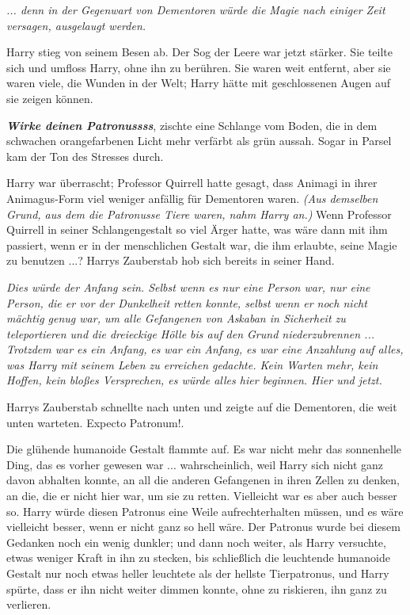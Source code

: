 \emph{... denn in der Gegenwart von Dementoren würde die Magie nach einiger
Zeit versagen, ausgelaugt werden.}

Harry stieg von seinem Besen ab. Der Sog der Leere war jetzt stärker. Sie teilte
sich und umfloss Harry, ohne ihn zu berühren. Sie waren weit entfernt, aber sie
waren viele, die Wunden in der Welt; Harry hätte mit geschlossenen Augen auf sie
zeigen können.

\glqq{}\textbf{\emph{Wirke deinen Patronussss}}\grqq{}, zischte eine Schlange vom
Boden, die in dem schwachen orangefarbenen Licht mehr verfärbt als grün aussah.
Sogar in Parsel kam der Ton des Stresses durch.

Harry war überrascht; Professor Quirrell hatte gesagt, dass Animagi in ihrer
Animagus-Form viel weniger anfällig für Dementoren waren.\emph{ (Aus demselben
Grund, aus dem die Patronusse Tiere waren, nahm Harry an.)} Wenn Professor
Quirrell in seiner Schlangengestalt so viel Ärger hatte, was wäre dann mit ihm
passiert, wenn er in der menschlichen Gestalt war, die ihm erlaubte, seine Magie
zu benutzen ...? Harrys Zauberstab hob sich bereits in seiner Hand.

\emph{Dies würde der Anfang sein. Selbst wenn es nur eine Person war, nur eine
Person, die er vor der Dunkelheit retten konnte, selbst wenn er noch nicht
mächtig genug war, um alle Gefangenen von Askaban in Sicherheit zu teleportieren
und die dreieckige Hölle bis auf den Grund niederzubrennen ... Trotzdem war es
ein Anfang,} \emph{es war ein Anfang, es war eine Anzahlung auf alles, was Harry
mit seinem Leben zu erreichen gedachte. Kein Warten mehr, kein Hoffen, kein
bloßes Versprechen, es würde alles hier beginnen. Hier und jetzt.}

Harrys Zauberstab schnellte nach unten und zeigte auf die Dementoren, die weit
unten warteten. \glqq{}Expecto
Patronum!\grqq{}.

Die glühende humanoide Gestalt flammte auf. Es war nicht mehr das sonnenhelle
Ding, das es vorher gewesen war ... wahrscheinlich, weil Harry sich nicht ganz
davon abhalten konnte, an all die anderen Gefangenen in ihren Zellen zu denken,
an die, die er nicht hier war, um sie zu retten. Vielleicht war es aber auch
besser so. Harry würde diesen Patronus eine Weile aufrechterhalten müssen, und
es wäre vielleicht besser, wenn er nicht ganz so hell wäre. Der Patronus wurde
bei diesem Gedanken noch ein wenig dunkler; und dann noch weiter, als Harry
versuchte, etwas weniger Kraft in ihn zu stecken, bis schließlich die leuchtende
humanoide Gestalt nur noch etwas heller leuchtete als der hellste Tierpatronus,
und Harry spürte, dass er ihn nicht weiter dimmen konnte, ohne zu riskieren, ihn
ganz zu verlieren.

